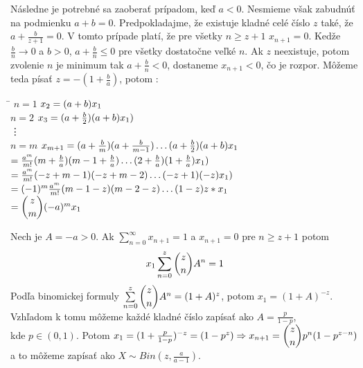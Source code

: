 \documentclass[a4paper,10pt]{article}
\theoremstyle{plain}
\theoremstyle{definition}
\begin{document}

Následne je potrebné sa zaoberať prípadom, keď $ a<0 $. Nesmieme však zabudnúť na podmienku $ a+b=0 $.
Predpokladajme, že existuje kladné celé číslo $ z $ také, že $ a + \frac{b}{z+1} = 0 $. V tomto prípade
platí, že pre všetky $ n\geq z+1  $ $ x_{n+1} = 0 $.
Kedže $ \frac{b}{n} \rightarrow 0$ a $ b>0 $, $a + \frac{b}{n} \leq 0$ pre všetky dostatočne veľké $ n $. Ak $ z $ neexistuje,
potom zvolenie $ n $ je minimum tak $ a+\frac{b}{n} <0$, dostaneme $ x_{n+1} <0 $, čo je rozpor.
Môžeme teda písať $ z = -(1+\frac{b}{a}) $, potom :
\begin{spacing}{1.6}
\begin{tabbing}
\hspace{1.5cm}\=\kill 
$ n=1 $ \> $x_{2}=(a+b)\*x_{1} $\\
$ n=2 $ \> $x_{3}=(a + \frac{b}{2}) \* (a + b)\*x_{1} ) $\\
 \> \vdots \\
$ n = m $ \> $ x_{m+1} = (a + \frac{b}{m})\*(a + \frac{b}{m-1})\ldots (a + \frac{b}{2})\*(a+b)\*x_{1}$\\
\> $= \frac{a^{m}}{m!}\*(m + \frac{b}{a})\*(m-1+\frac{b}{a}) \ldots (2+\frac{b}{a})\*(1+\frac{b}{a})\*x_{1}) $\\
\> $= \frac{a^{m}}{m!}\*(-z+m-1)\*(-z+m-2) \ldots (-z+1)\*(-z)\*x_{1}) $\\
\> $= (-1)^{m}\*\frac{a^{m}}{m!}\*(m-1-z)\*(m-2-z)\ldots(1-z)\*z*x_{1} $\\
\> $= \dbinom{z}{m}\*(-a)^{m}\*x_{1}  $\\
\end{tabbing} 
\end{spacing}
Nech je $ A = -a >0 $. Ak $ \sum\limits_{n=0}^\infty x_{n+1} = 1 $ a $ x_{n+1} = 0 $ pre $ n\geq z+1 $ potom 
	$$ x_{1} \sum\limits_{n=0}^z \dbinom{z}{n} A^{n}= 1 $$\newpage
Podľa binomickej formuly $ \sum\limits_{n=0}^z \dbinom{z}{n} A^{n}= (1+A)^{z} $, potom $ x_{1} = (1+A)^{-z} $.
Vzhľadom k tomu môžeme každé kladné číslo zapísať ako $ A = \frac{p}{1-p} $,\\ kde $ p \in (0,1) $. Potom
$ x_{1} = (1 + \frac{p}{1-p})^{-z} = (1-p^{z}) \Rightarrow x_{n+1} = \dbinom{z}{n}\*p^{n}\*(1-p^{z-n}) $ a to 
môžeme zapísať ako $ X \sim Bin(z,\frac{a}{a-1}) $.%
\newpage
\end{document}
